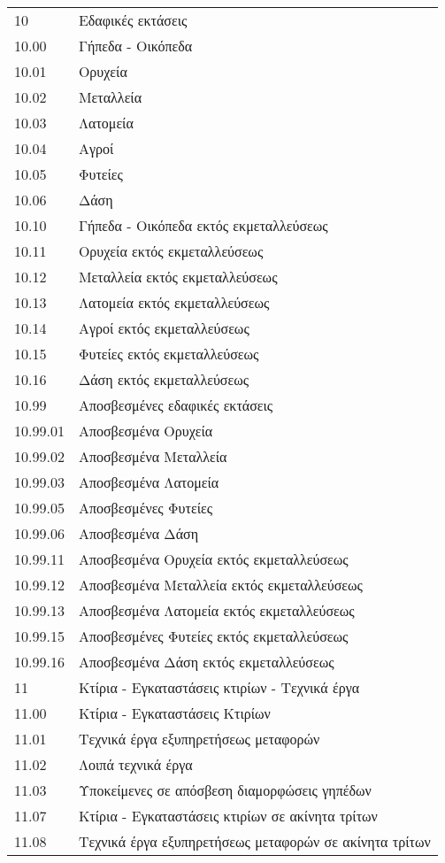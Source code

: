 \documentclass[A4,10pt,greek]{book}
\begin{document}
\begin{tabularx}{\linewidth}{lX}
10 & Εδαφικές εκτάσεις\\
10.00 & Γήπεδα - Οικόπεδα\\
10.01 & Ορυχεία\\
10.02 & Μεταλλεία\\
10.03 & Λατομεία\\
10.04 & Αγροί\\
10.05 & Φυτείες\\
10.06 & Δάση\\
10.10 & Γήπεδα - Οικόπεδα εκτός εκμεταλλεύσεως\\
10.11 & Ορυχεία εκτός εκμεταλλεύσεως\\
10.12 & Μεταλλεία εκτός εκμεταλλεύσεως\\
10.13 & Λατομεία εκτός εκμεταλλεύσεως\\
10.14 & Αγροί εκτός εκμεταλλεύσεως\\
10.15 & Φυτείες εκτός εκμεταλλεύσεως\\
10.16 & Δάση εκτός εκμεταλλεύσεως\\
10.99 & Αποσβεσμένες εδαφικές εκτάσεις\\
10.99.01 & Αποσβεσμένα Ορυχεία\\
10.99.02 & Αποσβεσμένα Μεταλλεία\\
10.99.03 & Αποσβεσμένα Λατομεία\\
10.99.05 & Αποσβεσμένες Φυτείες\\
10.99.06 & Αποσβεσμένα Δάση\\
10.99.11 & Αποσβεσμένα Ορυχεία εκτός εκμεταλλεύσεως\\
10.99.12 & Αποσβεσμένα Μεταλλεία εκτός εκμεταλλεύσεως\\
10.99.13 & Αποσβεσμένα Λατομεία εκτός εκμεταλλεύσεως\\
10.99.15 & Αποσβεσμένες Φυτείες εκτός εκμεταλλεύσεως\\
10.99.16 & Αποσβεσμένα Δάση εκτός εκμεταλλεύσεως\\
11 & Κτίρια - Εγκαταστάσεις κτιρίων - Τεχνικά έργα\\
11.00 & Κτίρια - Εγκαταστάσεις Κτιρίων\\
11.01 & Τεχνικά έργα εξυπηρετήσεως μεταφορών\\
11.02 & Λοιπά τεχνικά έργα\\
11.03 & Υποκείμενες σε απόσβεση διαμορφώσεις γηπέδων\\
11.07 & Κτίρια - Εγκαταστάσεις κτιρίων σε ακίνητα τρίτων\\
11.08 & Τεχνικά έργα εξυπηρετήσεως μεταφορών σε ακίνητα τρίτων\\

\end{tabularx}
\end{document}
